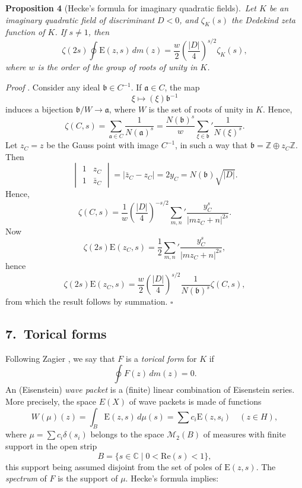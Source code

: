 \documentclass[12pt]{article}
\begin{document}
\medskip

\noindent
\textbf{Proposition 4} (Hecke's formula for imaginary quadratic fields).\ 
\emph{Let $K$ be an imaginary quadratic field of discriminant $D < 0$, and $\zeta_K(s)$ the Dedekind zeta function of $K$. If $s \neq 1$, then}
\[
\zeta(2s) \oint \text{E}(z, s)\,dm(z) = \frac{w}{2} \left( \frac{|D|}{4} \right)^{s/2} \zeta_K(s),
\]
\emph{where $w$ is the order of the group of roots of unity in $K$.}

\medskip

\noindent
\emph{Proof} \cite{S}. Consider any ideal $\mathfrak{b} \in C^{-1}$. If $\mathfrak{a} \in C$, the map
\[
\xi \mapsto (\xi) \mathfrak{b}^{-1}
\]
induces a bijection $\mathfrak{b} / W \longrightarrow \mathfrak{a}$, where $W$ is the set of roots of unity in $K$. Hence,
\[
\zeta(C, s) = \sum_{\mathfrak{a} \in C} \frac{1}{N(\mathfrak{a})^s} = \frac{N(\mathfrak{b})^s}{w} \sum_{\xi \in \mathfrak{b}}' \frac{1}{N(\xi)^s}.
\]
Let $z_C = z$ be the Gauss point with image $C^{-1}$, in such a way that $\mathfrak{b} = \mathbb{Z} \oplus z_C \mathbb{Z}$. Then
\[
\begin{vmatrix} 1 & z_C \\ 1 & \bar{z}_C \end{vmatrix} = |\bar{z}_C - z_C| = 2y_C = N(\mathfrak{b}) \sqrt{|D|}.
\]
Hence,
\[
\zeta(C, s) = \frac{1}{w} \left( \frac{|D|}{4} \right)^{-s/2} \sum_{m,n}' \frac{y_C^s}{|mz_C + n|^{2s}}.
\]
Now
\[
\zeta(2s) \text{E}(z_C, s) = \frac{1}{2} \sum_{m,n}' \frac{y_C^s}{|mz_C + n|^{2s}},
\]
hence
\[
\zeta(2s) \text{E}(z_C, s) = \frac{w}{2} \left( \frac{|D|}{4} \right)^{s/2} \frac{1}{N(\mathfrak{b})^s} \zeta(C, s),
\]
from which the result follows by summation. $\square$

\subsection*{7.\ Torical forms}

Following Zagier \cite{Z}, we say that $F$ is a \emph{torical form} for $K$ if
\[
\oint F(z)\,dm(z) = 0.
\]
An (Eisenstein) \emph{wave packet} is a (finite) linear combination of Eisenstein series. More precisely, the space $E(X)$ of wave packets is made of functions
\[
W(\mu)(z) = \int_B \text{E}(z, s)\,d\mu(s) = \sum c_i \text{E}(z, s_i) \quad (z \in H),
\]
where $\mu = \sum c_i \delta(s_i)$ belongs to the space $\mathcal{M}_2(B)$ of measures with finite support in the open strip
\[
B = \{s \in \mathbb{C} \mid 0 < \text{Re}(s) < 1\},
\]
this support being assumed disjoint from the set of poles of $\text{E}(z, s)$. The \emph{spectrum} of $F$ is the support of $\mu$. Hecke's formula implies:
\end{document}
